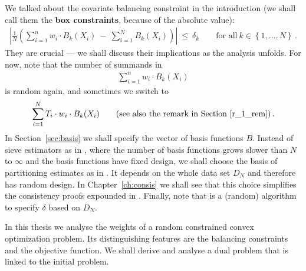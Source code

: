 We talked about the covariate balancing constraint
in the introduction
(we shall call them the \textbf{box constraints}, because of the absolute value):
\begin{gather*}
    \left| 
      \frac{1}{N} 
      \left( 
      \sum_{i = 1}^{n} 
      w_i
      \cdot
      B_k(X_i)
      \ 
      -
      \ 
      \sum_{i=1}^{N} 
      B_k(X_i)
      \right)
    \right|
    \ 
    \le 
    \ 
    \delta_k
    \qquad
    \text{for all}\ 
    k \in \left\{ 1, \ldots, N\right\}
    \,.
\end{gather*}
They are crucial --- we shall discuss their implications as the analysis unfolds.
For now, note that the number of summands in
\begin{gather*}
      \sum_{i = 1}^{n} 
      w_i
      \cdot
      B_k(X_i)
\end{gather*}
is random again, and sometimes we switch to
\begin{gather*}
      \sum_{i = 1}^{N} 
      T_i
      \cdot
      w_i
      \cdot
      B_k(X_i)
      \qquad
      \text{(see also the remark in Section~\ref{r_1_rem})}
      \,.
\end{gather*}
In Section~\ref{sec:basis} we shall specify the vector of basis functions $B$.
Instead of sieve estimators as in \cite{Wang2019}, where the number of basis functions grows slower than $N$ to $\infty$ 
and the basis functions have fixed design,
we shall choose the basis of partitioning estimates as in \cite[§4]{Gyorfi2002}.
It depends on the whole data set $D_N$
and therefore has random design.
In Chapter~\ref{ch:consis} we shall see that this choice simplifies the consistency proofs expounded in \cite[Proof of Lemma~2]{Wang2019}.
Finally, note that \cite[Algorithm~1 on page 11]{Wang2019}
is a (random) algorithm to specify $\delta$ based on $D_N$. 
\begin{takeaways}
  In this thesis we analyse the weights of a random constrained convex optimization problem.
  Its distinguishing features are the balancing constraints and the objective function.
  We shall derive and analyse a dual problem that is linked to the initial problem.
\end{takeaways}
